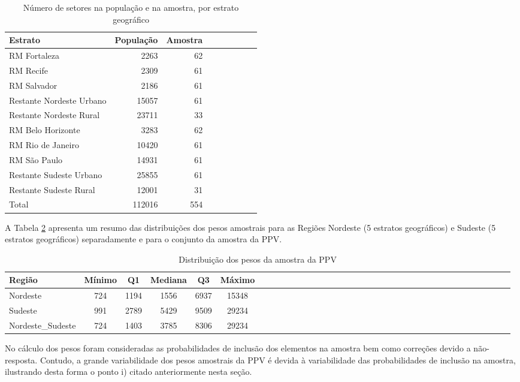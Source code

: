 \documentclass[]{book}
\theoremstyle{definition}
\theoremstyle{definition}
\theoremstyle{definition}
\theoremstyle{remark}
\begin{document}
\begin{table}

\caption{\label{tab:numset}Número de setores na população e na amostra, por estrato geográfico}
\centering
\begin{tabular}[t]{lrrlrrlrr}
\toprule
Estrato & População & Amostra\\
\midrule
RM Fortaleza & 2263 & 62\\
RM Recife & 2309 & 61\\
RM Salvador & 2186 & 61\\
Restante Nordeste Urbano & 15057 & 61\\
Restante Nordeste Rural & 23711 & 33\\
\addlinespace
RM Belo Horizonte & 3283 & 62\\
RM Rio de Janeiro & 10420 & 61\\
RM São Paulo & 14931 & 61\\
Restante Sudeste Urbano & 25855 & 61\\
Restante Sudeste Rural & 12001 & 31\\
Total & 112016 & 554\\
\bottomrule
\end{tabular}
\end{table}

A Tabela \ref{tab:dispesos} apresenta um resumo das distribuições dos
pesos amostrais para as Regiões Nordeste (5 estratos geográficos) e
Sudeste (5 estratos geográficos) separadamente e para o conjunto da
amostra da PPV.

\begin{table}

\caption{\label{tab:dispesos}Distribuição dos pesos da amostra da PPV}
\centering
\begin{tabular}[t]{lccccclccccclccccclccccclccccclccccc}
\toprule
Região & Mínimo & Q1 & Mediana & Q3 & Máximo\\
\midrule
Nordeste & 724 & 1194 & 1556 & 6937 & 15348\\
Sudeste & 991 & 2789 & 5429 & 9509 & 29234\\
Nordeste\_Sudeste & 724 & 1403 & 3785 & 8306 & 29234\\
\bottomrule
\end{tabular}
\end{table}

No cálculo dos pesos foram consideradas as probabilidades de inclusão
dos elementos na amostra bem como correções devido a não-resposta.
Contudo, a grande variabilidade dos pesos amostrais da PPV é devida à
variabilidade das probabilidades de inclusão na amostra, ilustrando
desta forma o ponto i) citado anteriormente nesta seção.
\end{document}
